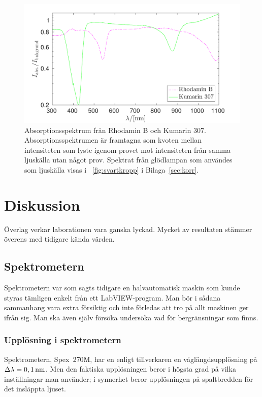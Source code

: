 \documentclass[11pt,a4paper]{article}
\newcommand{\figref}{\figurename~\ref}
\begin{document}
\begin{figure}\centering
\centerline{ %
\includegraphics[width=.9\textwidth]{absorption.pdf}
}
\caption{Absorptionsspektrum från Rhodamin B och Kumarin
  307. Absorptionsspektrumen är framtagna som kvoten mellan
  intensiteten som lyste igenom provet mot intensiteten från samma
  ljuskälla utan något prov. Spektrat från glödlampan som användes som
  ljuskälla visas i \figref{fig:svartkropp} i Bilaga~\ref{sec:korr}.
}
\label{fig:absorption} 
\end{figure}

\section{Diskussion}
Överlag verkar laborationen vara ganska lyckad. Mycket av resultaten
stämmer överens med tidigare kända värden.


\subsection{Spektrometern}
Spektrometern var som sagts tidigare en halvautomatisk maskin som
kunde styras tämligen enkelt från ett LabVIEW-program. Man bör i
sådana sammanhang vara extra försiktig och inte förledas att tro på
allt maskinen ger ifrån sig. Man ska även själv försöka undersöka vad
för bergränsningar som finns. 

\subsubsection{Upplösning i spektrometern}
\label{sec:diskussion_upplosning}
Spektrometern, Spex~270M, har en enligt tillverkaren \cite{Spex270M}
en våglängdsupplösning på $\Delta\lambda=\unit[0,1]{nm}$. Men den
faktiska upplösningen beror i högsta grad på vilka inställningar man
använder; i synnerhet beror upplösningen på spaltbredden för det
insläppta ljuset. 
\end{document}
